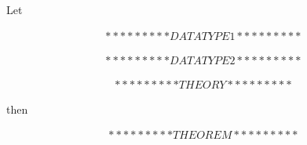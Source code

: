 \documentclass[a4paper]{article}
\begin{document}
\pagestyle{empty}

\begin{center}


\fontsize{18}{5}\selectfont
Let\\
\vspace{0.65cm}

\begin{eqnarray*}
*********DATA TYPE1*********
\end{eqnarray*}

\begin{eqnarray*}
*********DATA TYPE2*********
\end{eqnarray*}

\begin{eqnarray*}
*********THEORY*********
\end{eqnarray*}

\vspace{0.3cm}
then

\fontsize{20}{5}\selectfont
\begin{eqnarray*}
*********THEOREM*********
\end{eqnarray*}

\end{center}
\end{document}
